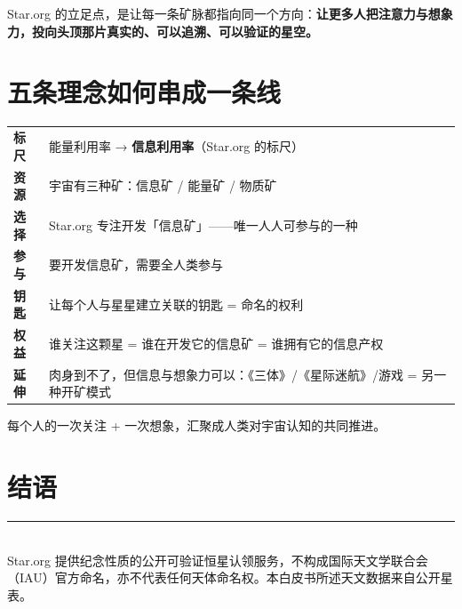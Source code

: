 \documentclass[11pt,fontset=none]{ctexart}
\begin{document}

Star.org 的立足点，是让每一条矿脉都指向同一个方向：\textbf{让更多人把注意力与想象力，投向头顶那片真实的、可以追溯、可以验证的星空。}

\section{五条理念如何串成一条线}

\begin{center}
\sffamily\small
\begin{tabularx}{0.94\linewidth}{@{}l X@{}}
\toprule
\textbf{标尺} & 能量利用率 → \textbf{信息利用率}（Star.org 的标尺） \\
\textbf{资源} & 宇宙有三种矿：信息矿 / 能量矿 / 物质矿 \\
\textbf{选择} & Star.org 专注开发「信息矿」——唯一人人可参与的一种 \\
\textbf{参与} & 要开发信息矿，需要全人类参与 \\
\textbf{钥匙} & 让每个人与星星建立关联的钥匙 = 命名的权利 \\
\textbf{权益} & 谁关注这颗星 = 谁在开发它的信息矿 = 谁拥有它的信息产权 \\
\textbf{延伸} & 肉身到不了，但信息与想象力可以：《三体》/《星际迷航》/游戏 = 另一种开矿模式 \\
\bottomrule
\end{tabularx}
\end{center}

\vspace{4mm}
每个人的一次关注 + 一次想象，汇聚成人类对宇宙认知的共同推进。

\section{结语}


\vspace{6mm}
\noindent\textcolor{line}{\rule{\linewidth}{0.6pt}}\\[3mm]
{\small\color{inkfaint}
Star.org 提供纪念性质的公开可验证恒星认领服务，不构成国际天文学联合会（IAU）官方命名，亦不代表任何天体命名权。本白皮书所述天文数据来自公开星表。}
\end{document}
